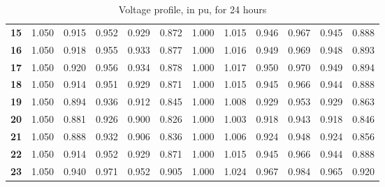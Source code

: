 \begin{table}[!htb]
\begin{tabular}{|c|ccccccccccc|}
        \textbf{15} & 1.050 & 0.915 & 0.952 & 0.929 & 0.872 & 1.000 & 1.015 & 0.946 & 0.967 & 0.945 & 0.888 \\
        \textbf{16} & 1.050 & 0.918 & 0.955 & 0.933 & 0.877 & 1.000 & 1.016 & 0.949 & 0.969 & 0.948 & 0.893 \\
        \textbf{17} & 1.050 & 0.920 & 0.956 & 0.934 & 0.878 & 1.000 & 1.017 & 0.950 & 0.970 & 0.949 & 0.894 \\
        \textbf{18} & 1.050 & 0.914 & 0.951 & 0.929 & 0.871 & 1.000 & 1.015 & 0.945 & 0.966 & 0.944 & 0.888 \\
        \textbf{19} & 1.050 & 0.894 & 0.936 & 0.912 & 0.845 & 1.000 & 1.008 & 0.929 & 0.953 & 0.929 & 0.863 \\
        \textbf{20} & 1.050 & 0.881 & 0.926 & 0.900 & 0.826 & 1.000 & 1.003 & 0.918 & 0.943 & 0.918 & 0.846 \\
        \textbf{21} & 1.050 & 0.888 & 0.932 & 0.906 & 0.836 & 1.000 & 1.006 & 0.924 & 0.948 & 0.924 & 0.856 \\
        \textbf{22} & 1.050 & 0.914 & 0.952 & 0.929 & 0.871 & 1.000 & 1.015 & 0.945 & 0.966 & 0.944 & 0.888 \\
        \textbf{23} & 1.050 & 0.940 & 0.971 & 0.952 & 0.905 & 1.000 & 1.024 & 0.967 & 0.984 & 0.965 & 0.920 \\ \hline
    \end{tabular}
    \caption{Voltage profile, in pu, for 24 hours}
    \label{tab:volt1}
\end{table}


